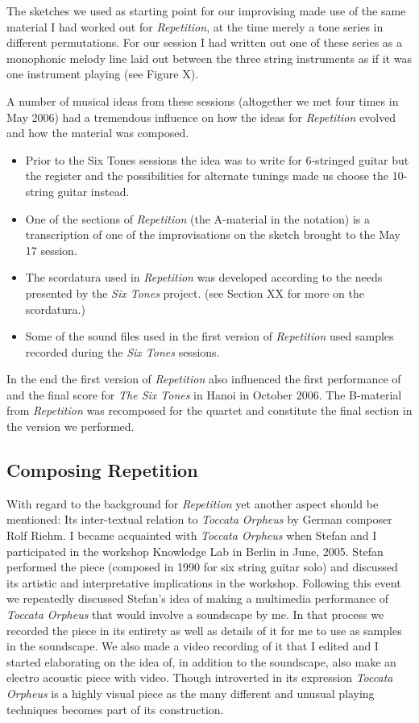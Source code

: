 The sketches we used as starting point for our improvising made use of
the same material I had worked out for \emph{Repetition}, at the time
merely a tone series in different permutations. For our session I had
written out one of these series as a monophonic melody line laid out
between the three string instruments as if it was one instrument
playing (see Figure X).

A number of musical ideas from these sessions (altogether we met four
times in May 2006) had a tremendous influence on how the ideas for
\emph{Repetition} evolved and how the material was composed. 
\begin{itemize}
\item Prior to the Six Tones sessions the idea was to write for
  6-stringed guitar but the register and the possibilities for
  alternate tunings made us choose the 10-string guitar instead.
\item One of the sections of \emph{Repetition} (the A-material in the
  notation) is a transcription of one of the improvisations on the
  sketch brought to the May 17 session.
\item The scordatura used in \emph{Repetition} was developed according to the needs
  presented by the \emph{Six Tones} project. (see Section XX for more
  on the scordatura.)
\item Some of the sound files used in the first version of
  \emph{Repetition} used samples recorded during the \emph{Six Tones}
  sessions.
\end{itemize}
In the end the first version of \emph{Repetition} also influenced the
first performance of and the final score for \emph{The Six Tones} in
Hanoi in October 2006. The B-material from \emph{Repetition} was
recomposed for the quartet and constitute the final section in the
version we performed.

\subsection{Composing Repetition}
\label{sec:composing-repetition-1}

With regard to the background for \emph{Repetition} yet another aspect
should be mentioned: Its inter-textual relation to \emph{Toccata
  Orpheus} by German composer Rolf Riehm. I became acquainted with
\emph{Toccata Orpheus} when Stefan and I participated in the workshop
Knowledge Lab in Berlin in June, 2005. Stefan performed the piece
(composed in 1990 for six string guitar solo) and discussed its
artistic and interpretative implications in the workshop. Following
this event we repeatedly discussed Stefan's idea of making a
multimedia performance of \emph{Toccata Orpheus} that would involve a
soundscape by me. In that process we recorded the piece in its
entirety as well as details of it for me to use as samples in the
soundscape. We also made a video recording of it that I edited and I
started elaborating on the idea of, in addition to the soundscape,
also make an electro acoustic piece with video. Though introverted in
its expression \emph{Toccata Orpheus} is a highly visual piece as the
many different and unusual playing techniques becomes part of its
construction.


